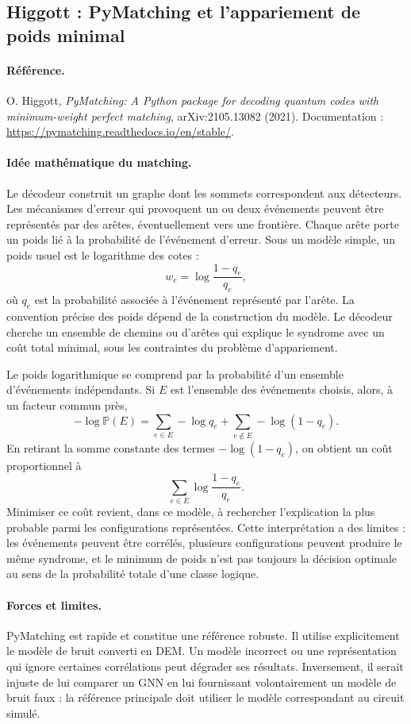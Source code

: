 \documentclass[11pt,a4paper]{article}
\newcommand{\Prb}{\mathbb{P}}
\begin{document}
\subsection{Higgott : PyMatching et l'appariement de poids minimal}

\paragraph{Référence.}
O. Higgott, \emph{PyMatching: A Python package for decoding quantum codes
with minimum-weight perfect matching}, arXiv:2105.13082 (2021).
Documentation : \url{https://pymatching.readthedocs.io/en/stable/}.

\paragraph{Idée mathématique du matching.}
Le décodeur construit un graphe dont les sommets correspondent aux
détecteurs. Les mécanismes d'erreur qui provoquent un ou deux événements
peuvent être représentés par des arêtes, éventuellement vers une frontière.
Chaque arête porte un poids lié à la probabilité de l'événement d'erreur.
Sous un modèle simple, un poids usuel est le logarithme des cotes :
\[
 w_e=\log\frac{1-q_e}{q_e},
\]
où $q_e$ est la probabilité associée à l'événement représenté par l'arête.
La convention précise des poids dépend de la construction du modèle. Le
décodeur cherche un ensemble de chemins ou d'arêtes qui explique le
syndrome avec un coût total minimal, sous les contraintes du problème
d'appariement.

Le poids logarithmique se comprend par la probabilité d'un ensemble
d'événements indépendants. Si $E$ est l'ensemble des événements choisis,
alors, à un facteur commun près,
\[
 -\log \Prb(E)
 =\sum_{e\in E}-\log q_e
  +\sum_{e\notin E}-\log(1-q_e).
\]
En retirant la somme constante des termes $-\log(1-q_e)$, on obtient un
coût proportionnel à
\[
 \sum_{e\in E}\log\frac{1-q_e}{q_e}.
\]
Minimiser ce coût revient, dans ce modèle, à rechercher l'explication la
plus probable parmi les configurations représentées. Cette interprétation
a des limites : les événements peuvent être corrélés, plusieurs configurations
peuvent produire le même syndrome, et le minimum de poids n'est pas toujours
la décision optimale au sens de la probabilité totale d'une classe logique.

\paragraph{Forces et limites.}
PyMatching est rapide et constitue une référence robuste. Il utilise
explicitement le modèle de bruit converti en DEM. Un modèle incorrect ou
une représentation qui ignore certaines corrélations peut dégrader ses
résultats. Inversement, il serait injuste de lui comparer un GNN en lui
fournissant volontairement un modèle de bruit faux : la référence principale
doit utiliser le modèle correspondant au circuit simulé.
\end{document}

